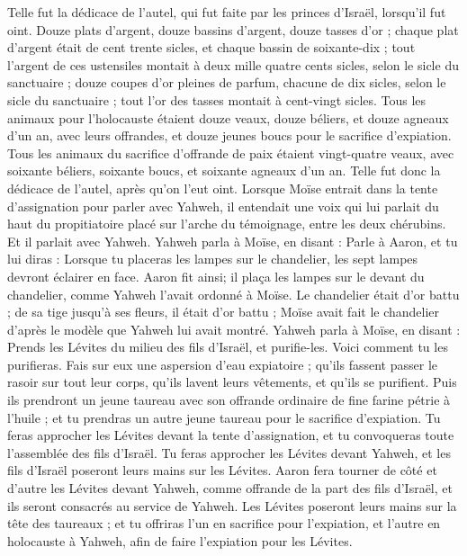\begin{multicols}{2}
Telle fut la dédicace de l'autel, qui fut faite par les princes d'Israël, lorsqu'il fut oint. Douze plats d'argent, douze bassins d'argent, douze tasses d'or ;
chaque plat d'argent était de cent trente sicles, et chaque bassin de soixante-dix ; tout l'argent de ces ustensiles montait à deux mille quatre cents sicles, selon le sicle du sanctuaire ;
douze coupes d'or pleines de parfum, chacune de dix sicles, selon le sicle du sanctuaire ; tout l'or des tasses montait à cent-vingt sicles.
Tous les animaux pour l'holocauste étaient douze veaux, douze béliers, et douze agneaux d'un an, avec leurs offrandes, et douze jeunes boucs pour le sacrifice d’expiation.
Tous les animaux du sacrifice d’offrande de paix étaient vingt-quatre veaux, avec soixante béliers, soixante boucs, et soixante agneaux d'un an. Telle fut donc la dédicace de l'autel, après qu’on l’eut oint.
Lorsque Moïse entrait dans la tente d'assignation pour parler avec Yahweh, il entendait une voix qui lui parlait du haut du propitiatoire placé sur l'arche du témoignage, entre les deux chérubins. Et il parlait avec Yahweh.
\VerseOne{}Yahweh parla à Moïse, en disant :
Parle à Aaron, et tu lui diras : Lorsque tu placeras les lampes sur le chandelier, les sept lampes devront éclairer en face.
Aaron fit ainsi; il plaça les lampes sur le devant du chandelier, comme Yahweh l'avait ordonné à Moïse.
Le chandelier était d'or battu ; de sa tige jusqu’à ses fleurs, il était d’or battu ; Moïse avait fait le chandelier d’après le modèle que Yahweh lui avait montré.
Yahweh parla à Moïse, en disant :
Prends les Lévites du milieu des fils d'Israël, et purifie-les.
Voici comment tu les purifieras. Fais sur eux une aspersion d'eau expiatoire ; qu’ils fassent passer le rasoir sur tout leur corps, qu’ils lavent leurs vêtements, et qu’ils se purifient.
Puis ils prendront un jeune taureau avec son offrande ordinaire de fine farine pétrie à l'huile ; et tu prendras un autre jeune taureau pour le sacrifice d’expiation.
Tu feras approcher les Lévites devant la tente d’assignation, et tu convoqueras toute l'assemblée des fils d'Israël.
Tu feras approcher les Lévites devant Yahweh, et les fils d'Israël poseront leurs mains sur les Lévites.
Aaron fera tourner de côté et d’autre les Lévites devant Yahweh, comme offrande de la part des fils d'Israël, et ils seront consacrés au service de Yahweh.
Les Lévites poseront leurs mains sur la tête des taureaux ; et tu offriras l’un en sacrifice pour l’expiation, et l'autre en holocauste à Yahweh, afin de faire l’expiation pour les Lévites.

\end{multicols}
